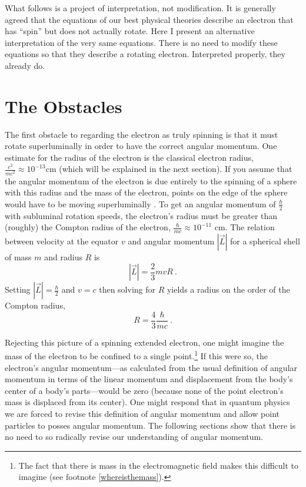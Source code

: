 \documentclass[12pt,secnumarabic,amsmath,amssymb,balancelastpage,nofootinbib]{article}
\begin{document}
What follows is a project of interpretation, not modification.  It is generally agreed that the equations of our best physical theories describe an electron that has ``spin'' but does not actually rotate.  Here I present an alternative interpretation of the very same equations.  There is no need to modify these equations so that they describe a rotating electron.  Interpreted properly, they already do.

\section{The Obstacles}\label{obstacles}

The first obstacle to regarding the electron as truly spinning is that it must rotate superluminally in order to have the correct angular momentum.  One estimate for the radius of the electron is the classical electron radius, $\frac{e^2}{m c^2}\approx10^{-13}\mbox{cm}$ (which will be explained in the next section).  If you assume that the angular momentum of the electron is due entirely to the spinning of a sphere with this radius and the mass of the electron, points on the edge of the sphere would have to be moving superluminally \citep[problem 4.25]{griffithsQM}.  To get an angular momentum of $\frac{\hbar}{2}$ with subluminal rotation speeds, the electron's radius must be greater than (roughly) the Compton radius of the electron, $\frac{\hbar}{m c}\approx10^{-11}\mbox{ cm}$.  The relation between velocity at the equator $v$ and angular momentum $|\vec{L}|$ for a spherical shell of mass $m$ and radius $R$ is
\begin{equation}
|\vec{L}| = \frac{2}{3}m v R\ .
\end{equation}
Setting $|\vec{L}| = \frac{\hbar}{2}$ and $v=c$ then solving for $R$ yields a radius on the order of the Compton radius,
\begin{equation}
R=\frac{4}{3}\frac{\hbar}{m c}\ .
\end{equation}

Rejecting this picture of a spinning extended electron, one might imagine the mass of the electron to be confined to a single point.\footnote{The fact that there is mass in the electromagnetic field makes this difficult to imagine (see footnote \ref{whereisthemass}).}  If this were so, the electron's angular momentum---as calculated from the usual definition of angular momentum in terms of the linear momentum and displacement from the body's center of a body's parts---would be zero (because none of the point electron's mass is displaced from its center).  One might respond that in quantum physics we are forced to revise this definition of angular momentum and allow point particles to posses angular momentum.  The following sections show that there is no need to so radically revise our understanding of angular momentum.
\end{document}
